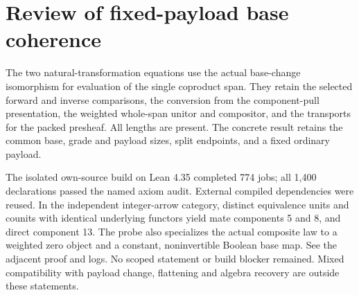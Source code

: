 \documentclass{article}
\begin{document}
\section*{Review of fixed-payload base coherence}
The two natural-transformation equations use the actual base-change isomorphism for evaluation of the single coproduct span. They retain the selected forward and inverse comparisons, the conversion from the component-pull presentation, the weighted whole-span unitor and compositor, and the transports for the packed presheaf. All lengths are present. The concrete result retains the common base, grade and payload sizes, split endpoints, and a fixed ordinary payload.
\par The isolated own-source build on Lean 4.35 completed 774 jobs; all 1,400 declarations passed the named axiom audit. External compiled dependencies were reused. In the independent integer-arrow category, distinct equivalence units and counits with identical underlying functors yield mate components 5 and 8, and direct component 13. The probe also specializes the actual composite law to a weighted zero object and a constant, noninvertible Boolean base map. See the adjacent proof and logs. No scoped statement or build blocker remained. Mixed compatibility with payload change, flattening and algebra recovery are outside these statements.
\end{document}
